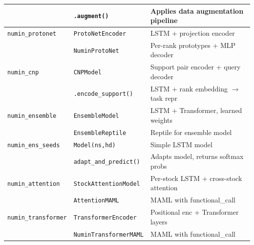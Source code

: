 \documentclass[11pt,a4paper]{article}
\begin{document}
\begin{longtable}{p{3cm}p{4cm}p{7.5cm}}
 & \texttt{.augment()} & Applies data augmentation pipeline \\
\midrule
\texttt{numin\_protonet} & \texttt{ProtoNetEncoder} & LSTM + projection encoder \\
 & \texttt{NuminProtoNet} & Per-rank prototypes + MLP decoder \\
\midrule
\texttt{numin\_cnp} & \texttt{CNPModel} & Support pair encoder + query decoder \\
 & \texttt{.encode\_support()} & LSTM + rank embedding $\to$ task repr \\
\midrule
\texttt{numin\_ensemble} & \texttt{EnsembleModel} & LSTM + Transformer, learned weights \\
 & \texttt{EnsembleReptile} & Reptile for ensemble model \\
\midrule
\texttt{numin\_ens\_seeds} & \texttt{Model(ns,hd)} & Simple LSTM model \\
 & \texttt{adapt\_and\_predict()} & Adapts model, returns softmax probs \\
\midrule
\texttt{numin\_attention} & \texttt{StockAttentionModel} & Per-stock LSTM + cross-stock attention \\
 & \texttt{AttentionMAML} & MAML with functional\_call \\
\midrule
\texttt{numin\_transformer} & \texttt{TransformerEncoder} & Positional enc + Transformer layers \\
 & \texttt{NuminTransformerMAML} & MAML with functional\_call \\


\end{longtable}
\end{document}
